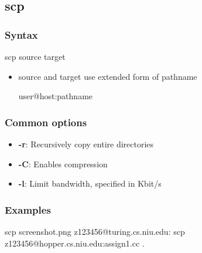 \documentclass{report}
\begin{document}
    \bigbreak \noindent 
    \subsection{scp}
    \bigbreak \noindent 
    \subsubsection{Syntax}
    \bigbreak \noindent 
    \begin{bashcode}
        scp source target
    \end{bashcode}
    \begin{itemize}
        \item source and target use extended form of pathname
            \bigbreak \noindent 
            \begin{bashcode}
            user@host:pathname
            \end{bashcode}
    \end{itemize}

    \bigbreak \noindent 
    \subsubsection{Common options}
    \begin{itemize}
        \item \textbf{-r}: Recursively copy entire directories
        \item \textbf{-C}: Enables compression
        \item \textbf{-l}: Limit bandwidth, specified in Kbit/s
    \end{itemize}

    \bigbreak \noindent 
    \subsubsection{Examples}
    \bigbreak \noindent 
    \begin{bashcode}
    scp screenshot.png z123456@turing.cs.niu.edu:
    scp z123456@hopper.cs.niu.edu:assign1.cc .
    \end{bashcode}



    
\end{document}
